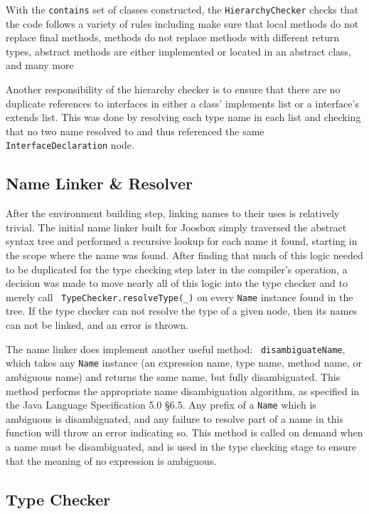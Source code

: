 \documentclass[letterpaper]{article}
\begin{document}
  With the {\tt contains} set of classes constructed, the {\tt HierarchyChecker}
  checks that the code follows a variety of rules including make sure that local
  methods do not replace final methods, methods do not replace methods with
  different return types, abstract methods are either implemented or located in
  an abstract class, and many more

  Another responsibility of the hierarchy checker is to ensure that there are no
  duplicate references to interfaces in either a class' implements list or a
  interface's extends list. This was done by resolving each type name in each
  list and checking that no two name resolved to and thus referenced the same
  {\tt InterfaceDeclaration} node.

  \subsection{Name Linker \& Resolver}

  After the environment building step, linking names to their uses is
  relatively trivial. The initial name linker built for Joosbox simply
  traversed the abstract syntax tree and performed a recursive lookup for each
  name it found, starting in the scope where the name was found. After finding
  that much of this logic needed to be duplicated for the type checking step
  later in the compiler's operation, a decision was made to move nearly all of
  this logic into the type checker and to merely call {\tt
  TypeChecker.resolveType(\_)} on every {\tt Name} instance found in the tree.
  If the type checker can not resolve the type of a given node, then its names
  can not be linked, and an error is thrown.

  The name linker does implement another useful method: {\tt
  disambiguateName}, which takes any {\tt Name} instance (an expression name,
  type name, method name, or ambiguous name) and returns the same name, but
  fully disambiguated. This method performs the appropriate name
  disambiguation algorithm, as specified in the Java Language Specification
  5.0 \S 6.5. Any prefix of a {\tt Name} which is ambiguous is disambiguated,
  and any failure to resolve part of a name in this function will throw an
  error indicating so. This method is called on demand when a name must be
  disambiguated, and is used in the type checking stage to ensure that the
  meaning of no expression is ambiguous.

  \subsection{Type Checker}
\end{document}
